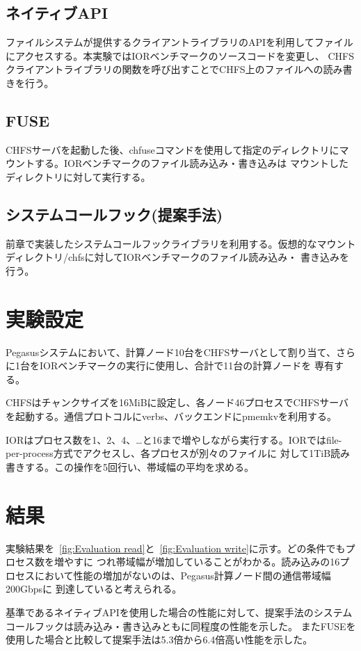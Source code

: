 \documentclass[a4paper,11pt]{jreport}
\begin{document}
\subsection{ネイティブAPI}
ファイルシステムが提供するクライアントライブラリのAPIを利用してファイルにアクセスする。本実験ではIORベンチマークのソースコードを変更し、
CHFSクライアントライブラリの関数を呼び出すことでCHFS上のファイルへの読み書きを行う。
\subsection{FUSE}
CHFSサーバを起動した後、chfuseコマンドを使用して指定のディレクトリにマウントする。IORベンチマークのファイル読み込み・書き込みは
マウントしたディレクトリに対して実行する。
\subsection{システムコールフック(提案手法)}
前章で実装したシステムコールフックライブラリを利用する。仮想的なマウントディレクトリ/chfsに対してIORベンチマークのファイル読み込み・
書き込みを行う。
\section{実験設定}
Pegasusシステムにおいて、計算ノード10台をCHFSサーバとして割り当て、さらに1台をIORベンチマークの実行に使用し、合計で11台の計算ノードを
専有する。

CHFSはチャンクサイズを16MiBに設定し、各ノード46プロセスでCHFSサーバを起動する。通信プロトコルにverbs、バックエンドにpmemkvを利用する。

IORはプロセス数を1、2、4、…と16まで増やしながら実行する。IORではfile-per-process方式でアクセスし、各プロセスが別々のファイルに
対して1TiB読み書きする。この操作を5回行い、帯域幅の平均を求める。
\section{結果}

実験結果を\figurename~\ref{fig:Evaluation read}と\figurename~\ref{fig:Evaluation write}に示す。どの条件でもプロセス数を増やすに
つれ帯域幅が増加していることがわかる。読み込みの16プロセスにおいて性能の増加がないのは、Pegasus計算ノード間の通信帯域幅200Gbpsに
到達していると考えられる。

基準であるネイティブAPIを使用した場合の性能に対して、提案手法のシステムコールフックは読み込み・書き込みともに同程度の性能を示した。
またFUSEを使用した場合と比較して提案手法は5.3倍から6.4倍高い性能を示した。
\end{document}
